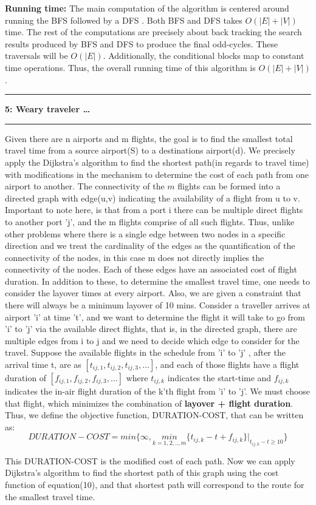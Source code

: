 \documentclass{article}
\newcommand\question[2]{\vspace{.25in}\hrule\textbf{#1: #2}\hrule\vspace{.10in}}
\newcommand\runtime{\vspace{.10in}\textbf{Running time: }}
\begin{document}
\runtime 
   The main computation of the algorithm is centered around running the BFS followed by a DFS .  Both BFS and DFS takes $O(|E| + |V|)$ time. The rest of the computations are precisely about back tracking the search results produced by BFS and DFS to produce the final odd-cycles. These traversals will be $O(|E|)$. Additionally, the conditional blocks map to constant time operations. Thus, the overall running time of this algorithm is $O(|E| + |V|)$. \newline


\question{5}{Weary traveler \dots}
  Given there are n airports and m flights, the goal is to find the smallest total travel time from a source airport(S) to a destinations airport(d). \newline
We precisely apply the Dijkstra's algorithm to find the shortest path(in regards to travel time) with modifications in the mechanism to determine the cost of each path from one airport to another. The connectivity of the $m$ flights can be formed into a directed graph with edge(u,v) indicating the availability of a flight from u to v. Important to note here, is that from a port i there can be multiple direct flights to  another port 'j', and the m flights comprise of all such flights. Thus, unlike other problems where there is a single edge between two nodes in a specific direction and we treat the cardinality of the edges as the quantification of the connectivity of the nodes, in this case m does not directly implies the connectivity of the nodes. Each of these edges have an associated cost of flight duration. \newline
In addition to these, to determine the smallest travel time, one needs to consider the layover times at every airport. Also, we are given a constraint that there will always be a minimum layover of 10 mins. \newline
Consider a traveller arrives at airport 'i' at time 't', and we want to determine the flight it will take to go from 'i' to 'j' via the available direct flights, that is, in the directed graph, there are multiple edges from i to j and we need to decide which edge to consider for the travel. Suppose the available flights in the schedule from 'i' to 'j' , after the arrival time t, are as $[t_{ij,1}, t_{ij,2}, t_{ij,3}, \dots]$, and each of those flights have a flight duration of $[f_{ij,1}, f_{ij,2}, f_{ij,3}, \dots]$ where $t_{ij,k}$ indicates the start-time and $f_{ij,k}$ indicates the in-air flight duration of the k'th flight from 'i' to 'j'. We must choose that flight, which minimizes the combination of \textbf {layover + flight duration}. \newline
  Thus, we define the objective function, DURATION-COST, that can be written as: \newline
  \begin{equation}
	  DURATION-COST = min \bigg \{ \infty, \underset{k=1,2,..,m}{min}{\{t_{ij,k} - t + f_{ij,k}\}\bigg |_{t_{ij,k}-t \geq 10}}  \bigg \}
  \end{equation}

 This DURATION-COST is the modified cost of each path. Now we can apply Dijkstra's algorithm to find the shortest path of this graph using the cost function of equation(10), and that shortest path will correspond to the route for the smallest travel time. \newline
\end{document}
